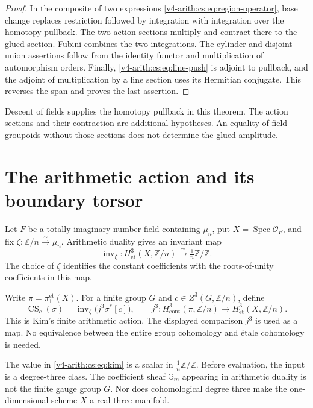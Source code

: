 \begin{proof}
In the composite of two expressions \eqref{v4-arith:cs:eq:region-operator},
base change replaces restriction followed by integration with integration
over the homotopy pullback. The two action sections multiply and contract
there to the glued section. Fubini combines the two integrations. The
cylinder and disjoint-union assertions follow from the identity functor and
multiplication of automorphism orders. Finally,
\eqref{v4-arith:cs:eq:line-push} is adjoint to pullback, and the adjoint of
multiplication by a line section uses its Hermitian conjugate. This reverses
the span and proves the last assertion.
\end{proof}

Descent of fields supplies the homotopy pullback in this theorem. The action
sections and their contraction are additional hypotheses. An equality of
field groupoids without those sections does not determine the glued
amplitude.

\section{The arithmetic action and its boundary torsor}
\label{v4-arith:cs:arithmetic-action}

Let \(F\) be a totally imaginary number field containing \(\mu_n\), put
\(X=\operatorname{Spec}\mathcal O_F\), and fix \(\zeta:\mathbb
Z/n\xrightarrow{\sim}\mu_n\). Arithmetic duality gives an invariant map
\[
 \operatorname{inv}_\zeta:H^3_{\mathrm{\acute et}}(X,\mathbb Z/n)
       \xrightarrow{\sim}\tfrac1n\mathbb Z/\mathbb Z.
\]
The choice of \(\zeta\) identifies the constant coefficients with the
roots-of-unity coefficients in this map.

Write \(\pi=\pi_1^{\mathrm{\acute et}}(X)\). For a finite group \(G\) and
\(c\in Z^3(G,\mathbb Z/n)\), define
\begin{equation}
 \operatorname{CS}_c(\sigma)
 =\operatorname{inv}_\zeta\bigl(j^3\sigma^*[c]\bigr),
 \qquad
 j^3:H^3_{\mathrm{cont}}(\pi,\mathbb Z/n)
                \longrightarrow H^3_{\mathrm{\acute et}}(X,\mathbb Z/n).
 \label{v4-arith:cs:eq:kim}
\end{equation}
This is Kim's finite arithmetic action. The displayed comparison \(j^3\) is
used as a map. No equivalence between the entire group cohomology and
\'{e}tale cohomology is needed.

The value in \eqref{v4-arith:cs:eq:kim} is a scalar in \(\tfrac1n\mathbb
Z/\mathbb Z\). Before evaluation, the input is a degree-three class. The
coefficient sheaf \(\mathbb G_m\) appearing in arithmetic duality is not the
finite gauge group \(G\). Nor does cohomological degree three make the
one-dimensional scheme \(X\) a real three-manifold.

